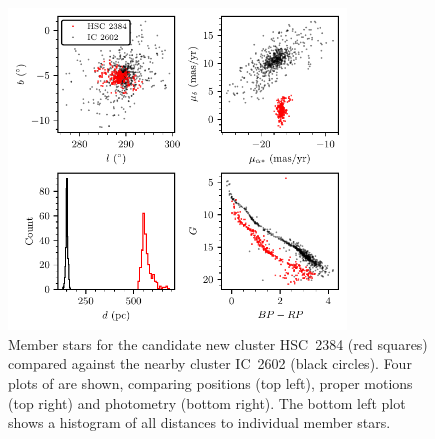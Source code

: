 \begin{figure}[t]
   \centering
   \includegraphics[width=0.8\textwidth]{fig/c3/fig_results_hsc_2384.pdf}
   \caption[Member stars for the candidate new cluster HSC~2384 compared against the nearby cluster IC~2602]{Member stars for the candidate new cluster HSC~2384 (red squares) compared against the nearby cluster IC~2602 (black circles). Four plots of are shown, comparing positions (top left), proper motions (top right) and photometry (bottom right). The bottom left plot shows a histogram of all distances to individual member stars.}%
   \label{c3:fig:hsc_2384}
\end{figure}

